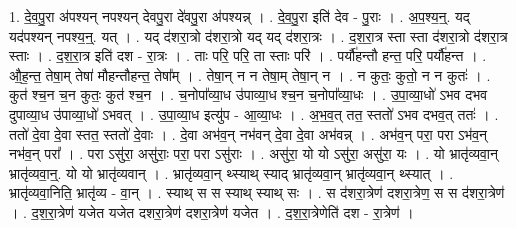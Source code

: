 \documentclass[17pt]{extarticle}
\begin{document}
1. दे॒व॒पु॒रा अ॑पश्यन् नपश्यन् देवपु॒रा दे॑वपु॒रा अ॑पश्यन्न् । . दे॒व॒पु॒रा इति॑ देव - पु॒राः । . अ॒प॒श्य॒न्॒. यद् यद॑पश्यन् नपश्य॒न्॒. यत् । . यद् द॑शरा॒त्रो द॑शरा॒त्रो यद् यद् द॑शरा॒त्रः । . द॒श॒रा॒त्र स्ता स्ता द॑शरा॒त्रो द॑शरा॒त्र स्ताः । . द॒श॒रा॒त्र इति॑ दश - रा॒त्रः । . ताः परि॒ परि॒ ता स्ताः परि॑ । . पर्यौ॑हन्तौ हन्त॒ परि॒ पर्यौ॑हन्त । . औ॒ह॒न्त॒ तेषा॒म् तेषा॑ मौहन्तौहन्त॒ तेषा᳚म् । . तेषा॒न् न न तेषा॒म् तेषा॒न् न । . न कुतः॒ कुतो॒ न न कुतः॑ । . कुत॑ श्च॒न च॒न कुतः॒ कुत॑ श्च॒न । . च॒नोपा᳚व्या॒ध उ॑पाव्या॒ध श्च॒न च॒नोपा᳚व्या॒धः । . उ॒पा॒व्या॒धो॑ ऽभव दभव दुपाव्या॒ध उ॑पाव्या॒धो॑ ऽभवत् । . उ॒पा॒व्या॒ध इत्यु॑प - आ॒व्या॒धः । . अ॒भ॒व॒त् तत॒ स्ततो॑ ऽभव दभव॒त् ततः॑ । . ततो॑ दे॒वा दे॒वा स्तत॒ स्ततो॑ दे॒वाः । . दे॒वा अभ॑व॒न् नभ॑वन् दे॒वा दे॒वा अभ॑वन्न् । . अभ॑व॒न् परा॒ परा ऽभ॑व॒न् नभ॑व॒न् परा᳚ । . परा ऽसु॑रा॒ असु॑राः॒ परा॒ परा ऽसु॑राः । . असु॑रा॒ यो यो ऽसु॑रा॒ असु॑रा॒ यः । . यो भ्रातृ॑व्यवा॒न् भ्रातृ॑व्यवा॒न्॒. यो यो भ्रातृ॑व्यवान् । . भ्रातृ॑व्यवा॒न् थ्स्याथ् स्याद् भ्रातृ॑व्यवा॒न् भ्रातृ॑व्यवा॒न् थ्स्यात् । . भ्रातृ॑व्यवा॒निति॒ भ्रातृ॑व्य - वा॒न् । . स्याथ् स स स्याथ् स्याथ् सः । . स द॑शरा॒त्रेण॑ दशरा॒त्रेण॒ स स द॑शरा॒त्रेण॑ । . द॒श॒रा॒त्रेण॑ यजेत यजेत दशरा॒त्रेण॑ दशरा॒त्रेण॑ यजेत । . द॒श॒रा॒त्रेणेति॑ दश - रा॒त्रेण॑ । \newline
\end{document}
